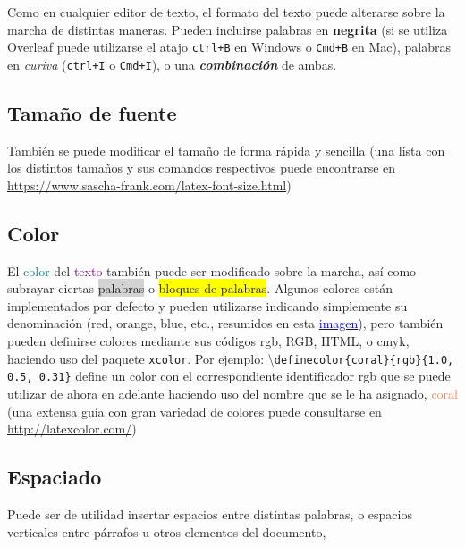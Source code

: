 \documentclass[a4paper, 11pt, spanish, twoside]{article}
\begin{document}
Como en cualquier editor de texto, el formato del texto puede alterarse sobre la marcha de distintas maneras. Pueden incluirse palabras en \textbf{negrita} (si se utiliza Overleaf puede utilizarse el atajo \texttt{ctrl+B} en Windows o \texttt{Cmd+B} en Mac), palabras en \textit{curiva} (\texttt{ctrl+I} o \texttt{Cmd+I}), o una \textit{\textbf{combinación}} de ambas.


\subsection{Tamaño de fuente}

También se puede modificar el {\huge tamaño} de forma {\footnotesize rápida} y {\Large sencilla} (una lista con los distintos tamaños y sus comandos respectivos puede encontrarse en \url{https://www.sascha-frank.com/latex-font-size.html})


\subsection{Color}


El \textcolor{teal}{color} del \textcolor{purple}{texto} también puede ser modificado sobre la marcha, así como subrayar ciertas \colorbox{lightgray}{palabras} o \colorbox{yellow}{bloques de palabras}. Algunos colores están implementados por defecto y pueden utilizarse indicando simplemente su denominación (red, orange, blue, etc., resumidos en esta \href{https://i.stack.imgur.com/tmoHS.png}{\textcolor{blue}{imagen}}), pero también pueden definirse colores mediante sus códigos rgb, RGB, HTML, o cmyk, haciendo uso del paquete \texttt{xcolor}. Por ejemplo: \textbackslash \texttt{definecolor\{coral\}\{rgb\}\{1.0, 0.5, 0.31\}} define un color con el correspondiente identificador rgb que se puede utilizar de ahora en adelante haciendo uso del nombre que se le ha asignado, \textcolor{coral}{coral} (una extensa guía con gran variedad de colores puede consultarse en \url{http://latexcolor.com/})


\subsection{Espaciado}

Puede ser de utilidad insertar \hspace{0.5cm} espacios \hspace{1cm} entre distintas \hspace{2cm} palabras, o espacios verticales entre párrafos u otros elementos del documento,
\end{document}
